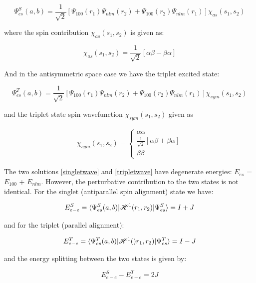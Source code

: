 \begin{equation}
\Psi^S_{es}(a,b)=\frac{1}{\sqrt{2}}[\Psi_{100}(r_1)\Psi_{nlm}(r_2)+\Psi_{100}(r_2)\Psi_{nlm}(r_1)]\chi_{as}(s_1,s_2)
\label{singletwave}
\end{equation}

where the spin contribution $\chi_{as}(s_1,s_2)$ is given as:

\begin{equation}
\chi_{as}(s_1,s_2)=\frac{1}{\sqrt{2}}[\alpha\beta-\beta\alpha]
\end{equation}

And in the antisymmetric space case we have the triplet excited state:

\begin{equation}
\Psi^T_{es}(a,b)=\frac{1}{\sqrt{2}}[\Psi_{100}(r_1)\Psi_{nlm}(r_2)+\Psi_{100}(r_2)\Psi_{nlm}(r_1)]\chi_{sym}(s_1,s_2)
\label{tripletwave}
\end{equation}

and the triplet state spin wavefunction $\chi_{sym}(s_1,s_2)$ given as

\begin{gather*}
\chi_{sym}(s_1,s_2)= 
\begin{cases}
	\alpha\alpha \\
	\frac{1}{\sqrt{2}}[\alpha\beta+\beta\alpha] \\
	\beta\beta
\end{cases}
\end{gather*}

The two solutions \ref{singletwave} and \ref{tripletwave} have degenerate energies: $E_{es}$ = $E_{100}$ + $E_{nlm}$. However, the perturbative contribution to the two states is not identical. For the singlet (antiparallel spin alignment) state we have:

\begin{equation}E_{e-e}^S=\braket{\Psi_{es}^S(a,b)|\mathscr{H}^1(r_1,r_2)|\Psi_{es}^S} = I+J
\label{matrixsinglet}
\end{equation}

and for the triplet (parallel alignment):

\begin{equation}E_{e-e}^T=\braket{\Psi_{es}^T(a,b)|\mathscr{H}^1()r_1,r_2)|\Psi_{es}^T} = I-J
\label{matrixtriplet}
\end{equation}

and the energy splitting between the two states is given by:

\begin{equation}
E_{e-e}^S-E_{e-e}^T=2J
\end{equation}

